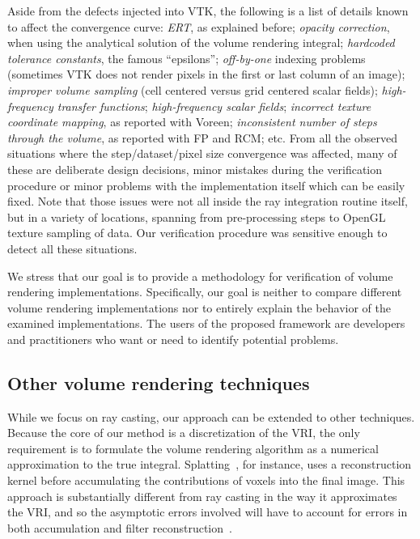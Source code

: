Aside from the defects injected into VTK, the following is a list of
details known to affect the convergence curve:
\emph{ERT}, as explained before;
\emph{opacity correction}, when using the analytical solution of the volume rendering integral;
\emph{hardcoded tolerance constants}, the famous ``epsilons'';
\emph{off-by-one} indexing problems (sometimes VTK does not render pixels in the first or last
column of an image);
\emph{improper volume sampling} (cell centered versus grid centered
scalar fields);
\emph{high-frequency transfer functions};
\emph{high-frequency scalar fields};
\emph{incorrect texture coordinate mapping}, as reported with Voreen;
\emph{inconsistent number of steps through the volume}, as reported
with FP and RCM; etc. %
From all the observed situations where the step/dataset/pixel size
convergence was affected, many of these are deliberate design
decisions, minor mistakes during the verification procedure or minor
problems with the implementation itself which can be easily fixed.
%
Note that those issues were not all inside the ray integration routine
itself, but in a variety of locations, spanning from pre-processing
steps to OpenGL texture sampling of data.
Our verification procedure was sensitive enough to detect all these
situations. 

We stress that our goal is to provide a methodology for verification
of volume rendering implementations. Specifically, our goal is neither
to compare different volume rendering implementations nor to entirely
explain the behavior of the examined implementations. The users of the
proposed framework are developers and practitioners who want or need
to identify potential problems.

\subsection{Other volume rendering techniques}

While we focus on ray casting, our approach can be extended to other
techniques. Because the core of our method is a discretization of the
VRI, the only requirement is to formulate the volume rendering
algorithm as a numerical approximation to the true integral.
Splatting~\cite{Westover:1989:IVR:329129.329138}, for instance, uses a
reconstruction kernel before accumulating the contributions of voxels
into the final image. This approach is substantially different from
ray casting in the way it approximates the VRI, and so the asymptotic
errors involved will have to account for errors in both accumulation
and filter reconstruction~\cite{Moller:1996:CLE:236226.236235}.

